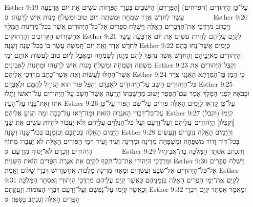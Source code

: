 Esther 9:19	עַל־כֵּן הַיְּהוּדִים (הפרוזים) [הַפְּרָזִים] הַיֹּשְׁבִים בְּעָרֵי הַפְּרָזוֹת עֹשִׂים אֵת יוֹם אַרְבָּעָה עָשָׂר לְחֹדֶשׁ אֲדָר שִׂמְחָה וּמִשְׁתֶּה וְיוֹם טוֹב וּמִשְׁלֹחַ מָנוֹת אִישׁ לְרֵעֵהוּ׃ {ס}        
Esther 9:20	וַיִּכְתֹּב מרְדֳּכַי אֶת־הַדְּבָרִים הָאֵלֶּה וַיִּשְׁלַח סְפָרִים אֶל־כּל־הַיְּהוּדִים אֲשֶׁר בְּכל־מְדִינוֹת הַמֶּלֶךְ אֲחַשְׁוֵרוֹשׁ הַקְּרוֹבִים וְהָרְחוֹקִים׃
Esther 9:21	לְקַיֵּם עֲלֵיהֶם לִהְיוֹת עֹשִׂים אֵת יוֹם אַרְבָּעָה עָשָׂר לְחֹדֶשׁ אֲדָר וְאֵת יוֹם־חֲמִשָּׁה עָשָׂר בּוֹ בְּכל־שָׁנָה וְשָׁנָה׃
Esther 9:22	כַּיָּמִים אֲשֶׁר־נָחוּ בָהֶם הַיְּהוּדִים מֵאֹיְבֵיהֶם וְהַחֹדֶשׁ אֲשֶׁר נֶהְפַּךְ לָהֶם מִיָּגוֹן לְשִׂמְחָה וּמֵאֵבֶל לְיוֹם טוֹב לַעֲשׂוֹת אוֹתָם יְמֵי מִשְׁתֶּה וְשִׂמְחָה וּמִשְׁלֹחַ מָנוֹת אִישׁ לְרֵעֵהוּ וּמַתָּנוֹת לָאֶבְיֹנִים׃
Esther 9:23	וְקִבֵּל הַיְּהוּדִים אֵת אֲשֶׁר־הֵחֵלּוּ לַעֲשׂוֹת וְאֵת אֲשֶׁר־כָּתַב מרְדֳּכַי אֲלֵיהֶם׃
Esther 9:24	כִּי הָמָן בֶּן־הַמְּדָתָא הָאֲגָגִי צֹרֵר כּל־הַיְּהוּדִים חָשַׁב עַל־הַיְּהוּדִים לְאַבְּדָם וְהִפִּל פּוּר הוּא הַגּוֹרָל לְהֻמָּם וּלְאַבְּדָם׃
Esther 9:25	וּבְבֹאָהּ לִפְנֵי הַמֶּלֶךְ אָמַר עִם־הַסֵּפֶר יָשׁוּב מַחֲשַׁבְתּוֹ הָרָעָה אֲשֶׁר־חָשַׁב עַל־הַיְּהוּדִים עַל־רֹאשׁוֹ וְתָלוּ אֹתוֹ וְאֶת־בָּנָיו עַל־הָעֵץ׃
Esther 9:26	עַל־כֵּן קָרְאוּ לַיָּמִים הָאֵלֶּה פוּרִים עַל־שֵׁם הַפּוּר עַל־כֵּן עַל־כּל־דִּבְרֵי הָאִגֶּרֶת הַזֹּאת וּמָה־רָאוּ עַל־כָּכָה וּמָה הִגִּיעַ אֲלֵיהֶם׃
Esther 9:27	קִיְּמוּ (וקבל) [וְקִבְּלוּ] הַיְּהוּדִים  עֲלֵיהֶם  וְעַל־זַרְעָם וְעַל כּל־הַנִּלְוִים עֲלֵיהֶם וְלֹא יַעֲבוֹר לִהְיוֹת עֹשִׂים אֵת שְׁנֵי הַיָּמִים הָאֵלֶּה כִּכְתָבָם וְכִזְמַנָּם בְּכל־שָׁנָה וְשָׁנָה׃
Esther 9:28	וְהַיָּמִים הָאֵלֶּה נִזְכָּרִים וְנַעֲשִׂים בְּכל־דּוֹר וָדוֹר מִשְׁפָּחָה וּמִשְׁפָּחָה מְדִינָה וּמְדִינָה וְעִיר וָעִיר וִימֵי הַפּוּרִים הָאֵלֶּה לֹא יַעַבְרוּ מִתּוֹךְ הַיְּהוּדִים וְזִכְרָם לֹא־יָסוּף מִזַּרְעָם׃ {ס}        
Esther 9:29	וַתִּכְתֹּב אֶסְתֵּר הַמַּלְכָּה בַת־אֲבִיחַיִל וּמרְדֳּכַי הַיְּהוּדִי אֶת־כּל־תֹּקֶף לְקַיֵּם אֵת אִגֶּרֶת הַפֻּרִים הַזֹּאת הַשֵּׁנִית׃
Esther 9:30	וַיִּשְׁלַח סְפָרִים אֶל־כּל־הַיְּהוּדִים אֶל־שֶׁבַע וְעֶשְׂרִים וּמֵאָה מְדִינָה מַלְכוּת אֲחַשְׁוֵרוֹשׁ דִּבְרֵי שָׁלוֹם וֶאֱמֶת׃
Esther 9:31	לְקַיֵּם אֶת־יְמֵי הַפֻּרִים הָאֵלֶּה בִּזְמַנֵּיהֶם כַּאֲשֶׁר קִיַּם עֲלֵיהֶם מרְדֳּכַי הַיְּהוּדִי וְאֶסְתֵּר הַמַּלְכָּה וְכַאֲשֶׁר קִיְּמוּ עַל־נַפְשָׁם וְעַל־זַרְעָם דִּבְרֵי הַצּוֹמוֹת וְזַעֲקָתָם׃
Esther 9:32	וּמַאֲמַר אֶסְתֵּר קִיַּם דִּבְרֵי הַפֻּרִים הָאֵלֶּה וְנִכְתָּב בַּסֵּפֶר׃ {ס}        
